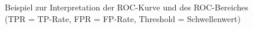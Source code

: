 \begin{figure}[p]
  \qquad
  \caption{Beispiel zur Interpretation der ROC-Kurve und des ROC-Bereiches (TPR = TP-Rate, FPR = FP-Rate, Threshold = Schwellenwert) \cite{Narkhede2018}
\label{fig:curves}}
\end{figure}

\cleardoublepage
